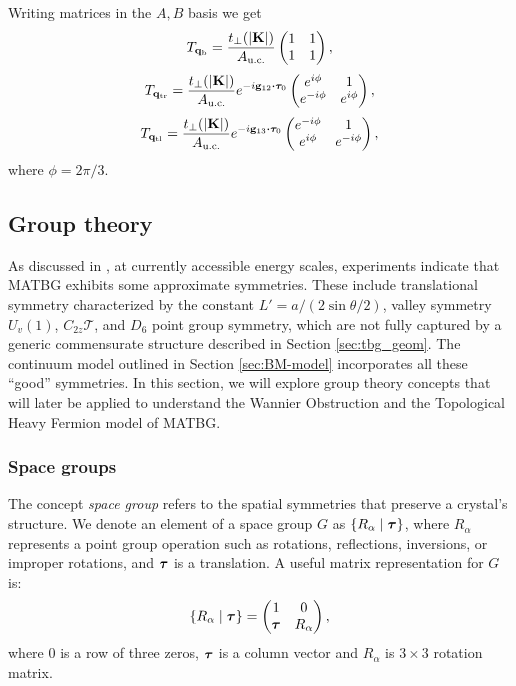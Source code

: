 \documentclass[12pt]{report}
\begin{document}
Writing matrices in the $A, B$ basis we get
\begin{equation} \label{eq:T-qb}
T_{{\vb{q}}_\text{b}} = \frac{t_\perp(\abs{\vb{K}})}{A_{\text{u.c.}}}
\begin{pmatrix}
1 & 1 \\
1 & 1
\end{pmatrix},
\end{equation}
\begin{equation} \label{eq:T-qtr}
T_{\q_\text{tr}} = \frac{t_\perp(\abs{\K})}{A_{\text{u.c.}}} e^{-i \g_{12} \vdot \vtau_0}
\begin{pmatrix}
e^{i\phi} & 1 \\
e^{-i\phi} & e^{i\phi}
\end{pmatrix},
\end{equation}
\begin{equation} \label{eq:T-qtl}
T_{\q_\text{tl}} = \frac{t_\perp(\abs{\K})}{A_{\text{u.c.}}} e^{-i \g_{13} \vdot \vtau_0}
\begin{pmatrix}
e^{-i\phi} & 1 \\
e^{i\phi} & e^{-i\phi}
\end{pmatrix},
\end{equation}
where $\phi = 2\pi/3$.


\subsection{Group theory} \label{sec:grouptheory}

As discussed in \cite{zou2018}, at currently accessible energy scales, experiments indicate that MATBG exhibits some approximate symmetries. These include translational symmetry characterized by the constant $L' = a / (2 \sin\theta/2)$, valley symmetry $U_v(1)$, $C_{2z} \mathcal{T}$, and $D_6$ point group symmetry, which are not fully captured by a generic commensurate structure described in Section \ref{sec:tbg_geom}. The continuum model outlined in Section \ref{sec:BM-model} incorporates all these ``good'' symmetries. In this section, we will explore group theory concepts that will later be applied to understand the Wannier Obstruction and the Topological Heavy Fermion model of MATBG.

\subsubsection{Space groups} \label{sec:spacegroups}

The concept \textit{space group} refers to the spatial symmetries that preserve a crystal's structure. We denote an element of a space group $G$ as $\{ R_\alpha \mid {\bm{\tau}} \}$, where $R_\alpha$ represents a point group operation such as rotations, reflections, inversions, or improper rotations, and ${\bm{\tau}}$ is a translation. A useful matrix representation for $G$ is:
\begin{equation} \label{eq:spacegroup-rep}
\{ R_\alpha \mid {\bm{\tau}} \} =
\begin{pmatrix}
1 & 0 \\
{\bm{\tau}} & R_\alpha
\end{pmatrix},
\end{equation}
where $0$ is a row of three zeros, ${\bm{\tau}}$ is a column vector and $R_\alpha$ is $3\times 3$ rotation matrix.
\end{document}
